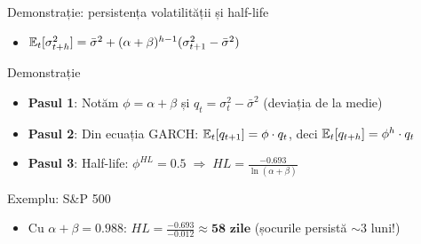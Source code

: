 \documentclass[9pt, aspectratio=169, t]{beamer}
\begin{document}
\begin{frame}{Demonstrație: persistența volatilității și half-life}
    \small
    \vspace{-0.2cm}
        \begin{prop}
            \begin{itemize}
                \item $\mathbb{E}_t[\sigma_{t+h}^2] = \bar{\sigma}^2 + (\alpha+\beta)^{h-1}(\sigma_{t+1}^2 - \bar{\sigma}^2)$
            \end{itemize}
        \end{prop}
        \vspace{-0.15cm}
        \begin{block}{Demonstrație}
            \begin{itemize}
                \item \textbf{Pasul 1}: Notăm $\phi = \alpha + \beta$ și $q_t = \sigma_t^2 - \bar{\sigma}^2$ (deviația de la medie)
                \item \textbf{Pasul 2}: Din ecuația GARCH: $\mathbb{E}_t[q_{t+1}] = \phi \cdot q_t$, deci $\mathbb{E}_t[q_{t+h}] = \phi^h \cdot q_t$
                \item \textbf{Pasul 3}: Half-life: $\phi^{HL} = 0.5 \;\Rightarrow\; HL = \frac{-0.693}{\ln(\alpha+\beta)}$
            \end{itemize}
        \end{block}
        \vspace{-0.15cm}
        \begin{exampleblock}{Exemplu: S\&P 500}
            \begin{itemize}
                \item Cu $\alpha + \beta = 0.988$: $HL = \frac{-0.693}{-0.012} \approx \textbf{58 zile}$ (șocurile persistă $\sim$3 luni!)
            \end{itemize}
        \end{exampleblock}
\end{frame}
\end{document}
